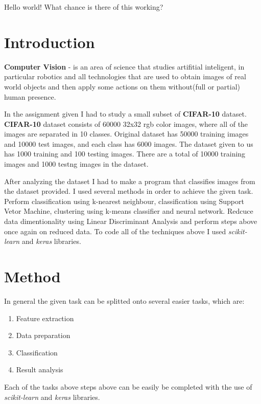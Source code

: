 \documentclass[a4paper,12pt]{article}
\begin{document}
Hello world! What chance is there of this working?

\section{Introduction}
\label{mystart} %
\textbf{Computer Vision} - is an area of science that studies artifitial inteligent, in particular
robotics and all technologies that are used to obtain images of real world objects and then apply some actions on
them without(full or partial) human presence. 

In the assignment given I had to study a small subset of \textbf{CIFAR-10} dataset. \textbf{CIFAR-10} dataset
consists of 60000 32x32 rgb color images, where all of the images are separated in 10 classes. Original dataset has 
50000 training images and 10000 test images, and each class has 6000 images. The dataset given to us has 1000 training
and 100 testing images. There are a total of 10000 training images and 1000 testng images in the dataset.

After analyzing the dataset I had to make a program that classifies images from the dataset provided. I used several 
methods in order to achieve the given task. Perform classification using k-nearest neighbour, classification using
Support Vetor Machine, clustering using k-means classifier and neural network. Redcuce data dimentionality using 
Linear Discriminant Analysis and perform steps above once again on reduced data. To code all of the techniques above 
I used \textit{scikit-learn} and \textit{keras} libraries. 

\section{Method}
In general the given task can be splitted onto several easier tasks, which are:
\begin{enumerate}
  \item Feature extraction
  \item Data preparation
  \item Classification
  \item Result analysis
\end{enumerate}
Each of the tasks above steps above can be easily be completed with the use of \textit{scikit-learn} 
and \textit{keras} libraries. 
\end{document}
